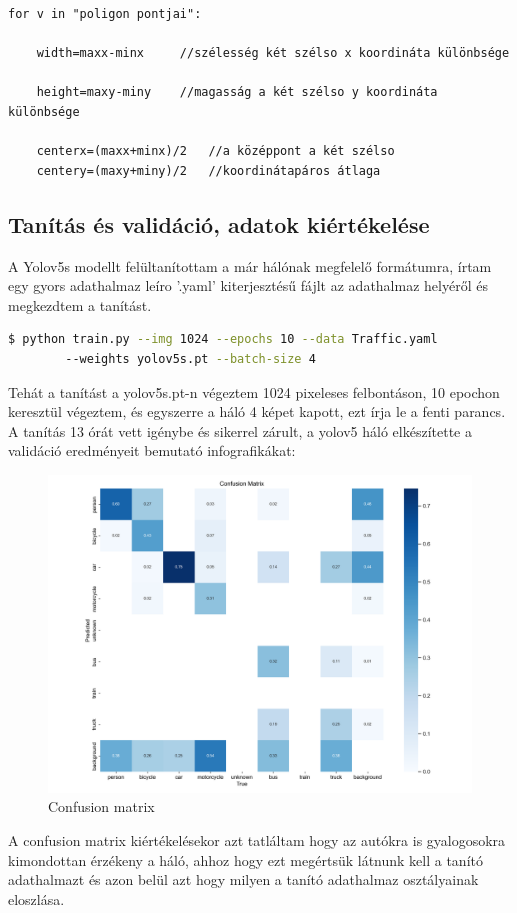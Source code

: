 \documentclass[12pt,oneside,a4paper]{article}
\theoremstyle{remark}
\begin{document}
\begin{verbatim}
for v in "poligon pontjai":

    width=maxx-minx     //szélesség két szélso x koordináta különbsége

    height=maxy-miny    //magasság a két szélso y koordináta különbsége

    centerx=(maxx+minx)/2   //a középpont a két szélso
    centery=(maxy+miny)/2   //koordinátapáros átlaga

\end{verbatim}
\newpage
\subsection{Tanítás és validáció, adatok kiértékelése}\label{subsec:tanitas-es-validacio-adatok-kiertekelese}
A Yolov5s modellt felültanítottam a már hálónak megfelelő formátumra, írtam egy gyors adathalmaz leíro '.yaml'
kiterjesztésű fájlt az adathalmaz helyéről és megkezdtem a tanítást.

\begin{lstlisting}[language=bash,label={lst:lstlisting}]
$ python train.py --img 1024 --epochs 10 --data Traffic.yaml
        --weights yolov5s.pt --batch-size 4
\end{lstlisting}
Tehát a tanítást a yolov5s.pt-n végeztem 1024 pixeleses felbontáson, 10 epochon keresztül végeztem, és egyszerre
a háló 4 képet kapott, ezt írja le a fenti parancs.
A tanítás 13 órát vett igénybe és sikerrel zárult, a yolov5 háló elkészítette a validáció eredményeit bemutató infografikákat:

\begin{figure} [ht]
    \centering
    \includegraphics[width=0.9\linewidth]{confusion_matrix}
    \caption{Confusion matrix}
    \label{fig:confusion}
\end{figure}
\newpage
A confusion matrix kiértékelésekor azt tatláltam hogy az autókra is gyalogosokra kimondottan érzékeny a háló,
ahhoz hogy ezt megértsük látnunk kell a tanító adathalmazt és azon belül azt hogy milyen a tanító adathalmaz osztályainak eloszlása.
\end{document}
